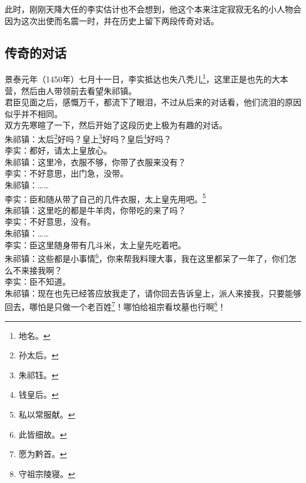 \begin{multicols}{\theparacolNo}
此时，刚刚天降大任的李实估计也不会想到，他这个本来注定寂寂无名的小人物会因为这次出使而名震一时，并在历史上留下两段传奇对话。\\

\subsection{传奇的对话}
景泰元年（1450年）七月十一日，李实抵达也失八秃儿\footnote{地名。}，这里正是也先的大本营，然后由人带领前去看望朱祁镇。\\

君臣见面之后，感慨万千，都流下了眼泪，不过从后来的对话看，他们流泪的原因似乎并不相同。\\

双方先寒暄了一下，然后开始了这段历史上极为有趣的对话。\\

朱祁镇：太后\footnote{孙太后。}好吗？皇上\footnote{朱祁钰。}好吗？皇后\footnote{钱皇后。}好吗？\\

李实：都好，请太上皇放心。\\

朱祁镇：这里冷，衣服不够，你带了衣服来没有？\\

李实：不好意思，出门急，没带。\\

朱祁镇：……\\

李实：臣和随从带了自己的几件衣服，太上皇先用吧。\footnote{私以常服献。}\\

朱祁镇：这里吃的都是牛羊肉，你带吃的来了吗？\\

李实：不好意思，没有。\\

朱祁镇：……\\

李实：臣这里随身带有几斗米，太上皇先吃着吧。\\

朱祁镇：这些都是小事情\footnote{此皆细故。}，你来帮我料理大事，我在这里都呆了一年了，你们怎么不来接我啊？\\

李实：臣不知道。\\

朱祁镇：现在也先已经答应放我走了，请你回去告诉皇上，派人来接我，只要能够回去，哪怕是只做一个老百姓\footnote{愿为黔首。}！哪怕给祖宗看坟墓也行啊\footnote{守祖宗陵寝。}！\\


\end{multicols}
